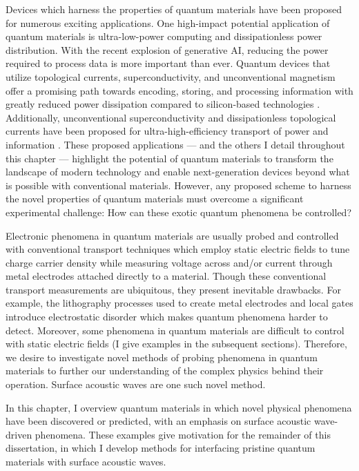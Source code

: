 \documentclass[double,12pt,1in,seploa]{beavtex}
\begin{document}
Devices which harness the properties of quantum materials have been proposed for numerous exciting applications. One high-impact potential application of quantum materials is ultra-low-power computing and dissipationless power distribution. With the recent explosion of generative AI, reducing the power required to process data is more important than ever. Quantum devices that utilize topological currents, superconductivity, and unconventional magnetism offer a promising path towards encoding, storing, and processing information with greatly reduced power dissipation compared to silicon-based technologies \cite{tokura_emergent_2017,hoffmann_quantum_2022,broholm_basic_2016}. Additionally, unconventional superconductivity and dissipationless topological currents have been proposed for ultra-high-efficiency transport of power and information \cite{broholm_basic_2016}. These proposed applications — and the others I detail throughout this chapter — highlight the potential of quantum materials to transform the landscape of modern technology and enable next-generation devices beyond what is possible with conventional materials. However, any proposed scheme to harness the novel properties of quantum materials must overcome a significant experimental challenge: How can these exotic quantum phenomena be controlled?

Electronic phenomena in quantum materials are usually probed and controlled with conventional transport techniques which employ static electric fields to tune charge carrier density while measuring voltage across and/or current through metal electrodes attached directly to a material. Though these conventional transport measurements are ubiquitous, they present inevitable drawbacks. For example, the lithography processes used to create metal electrodes and local gates introduce electrostatic disorder which makes quantum phenomena harder to detect. Moreover, some phenomena in quantum materials are difficult to control with static electric fields (I give examples in the subsequent sections). Therefore, we desire to investigate novel methods of probing phenomena in quantum materials to further our understanding of the complex physics behind their operation. Surface acoustic waves are one such novel method. 

In this chapter, I overview quantum materials in which novel physical phenomena have been discovered or predicted, with an emphasis on surface acoustic wave-driven phenomena. These examples give motivation for the remainder of this dissertation, in which I develop methods for interfacing pristine quantum materials with surface acoustic waves.
\end{document}
